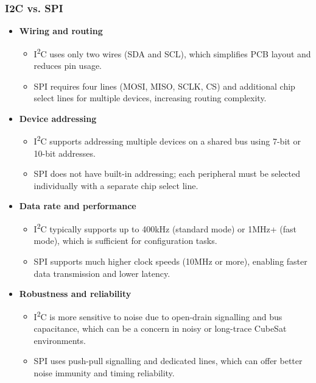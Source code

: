 \documentclass[10pt]{article}
\begin{document}
\begin{multicols}{2}
\subsubsection{I2C vs. SPI}

\begin{itemize}
    \item \textbf{Wiring and routing}
    \begin{itemize}
        \item I\textsuperscript{2}C uses only two wires (SDA and SCL), which simplifies PCB layout and reduces pin usage.
        \item SPI requires four lines (MOSI, MISO, SCLK, CS) and additional chip select lines for multiple devices, increasing routing complexity.
    \end{itemize}

    \item \textbf{Device addressing}
    \begin{itemize}
        \item I\textsuperscript{2}C supports addressing multiple devices on a shared bus using 7-bit or 10-bit addresses.
        \item SPI does not have built-in addressing; each peripheral must be selected individually with a separate chip select line.
    \end{itemize}

    \item \textbf{Data rate and performance}
    \begin{itemize}
        \item I\textsuperscript{2}C typically supports up to 400kHz (standard mode) or 1MHz+ (fast mode), which is sufficient for configuration tasks.
        \item SPI supports much higher clock speeds (10MHz or more), enabling faster data transmission and lower latency.
    \end{itemize}

    \item \textbf{Robustness and reliability}
    \begin{itemize}
        \item I\textsuperscript{2}C is more sensitive to noise due to open-drain signalling and bus capacitance, which can be a concern in noisy or long-trace CubeSat environments.
        \item SPI uses push-pull signalling and dedicated lines, which can offer better noise immunity and timing reliability.
    \end{itemize}


\end{itemize}
\end{multicols}
\end{document}

